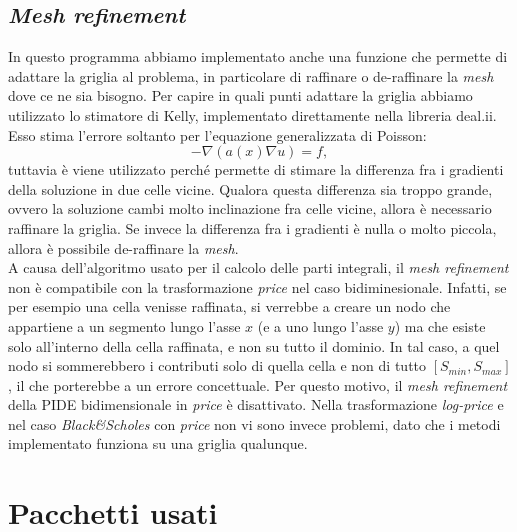 \documentclass[a4paper,10pt]{report}
\theoremstyle{plain}
\theoremstyle{definition}
\theoremstyle{remark}
\begin{document}
\section{\emph{Mesh refinement}}
In questo programma abbiamo implementato anche una funzione che permette di adattare la griglia al problema, in particolare di raffinare o de-raffinare la \emph{mesh} dove ce ne sia bisogno. Per capire in quali punti adattare la griglia abbiamo utilizzato lo stimatore di Kelly, implementato direttamente nella libreria \textsf{deal.ii}. Esso stima l'errore soltanto per l'equazione generalizzata di Poisson: $$-\nabla\left(a(x)\nabla u\right)=f,$$tuttavia \`e viene utilizzato perch\'e permette di stimare la differenza fra i gradienti della soluzione in due celle vicine. Qualora questa differenza sia troppo grande, ovvero la soluzione cambi molto inclinazione fra celle vicine, allora \`e necessario raffinare la griglia. Se invece la differenza fra i gradienti \`e nulla o molto piccola, allora \`e possibile de-raffinare la \emph{mesh}.\\
A causa dell'algoritmo usato per il calcolo delle parti integrali, il \emph{mesh refinement} non è compatibile con la trasformazione \emph{price} nel caso bidiminesionale. Infatti, se per esempio una cella venisse raffinata, si verrebbe a creare un nodo che appartiene a un segmento lungo l'asse $x$ (e a uno lungo l'asse $y$) ma che esiste solo all'interno della cella raffinata, e non su tutto il dominio. In tal caso, a quel nodo si sommerebbero i contributi solo di quella cella e non di tutto $[S_{min},S_{max}]$, il che porterebbe a un errore concettuale. Per questo motivo, il \emph{mesh refinement} della PIDE bidimensionale in \emph{price} \`e disattivato. Nella trasformazione \emph{log-price} e nel caso \emph{Black\&Scholes} con \emph{price} non vi sono invece problemi, dato che i metodi implementato funziona su una griglia qualunque.

\chapter{Pacchetti usati}
\end{document}
